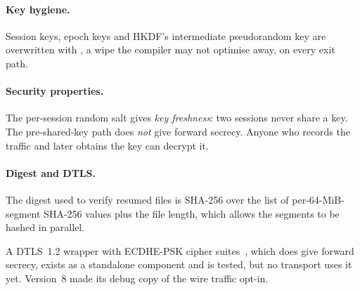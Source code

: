 \paragraph{Key hygiene.} Session keys, epoch keys and HKDF's intermediate pseudorandom key are overwritten
with , a wipe the compiler may not optimise away, on every exit path.

\paragraph{Security properties.} The per-session random salt gives \emph{key freshness}: two sessions never
share a key. The pre-shared-key path does \emph{not} give forward secrecy. Anyone who records the traffic and
later obtains the key can decrypt it.

\paragraph{Digest and DTLS.} The digest used to verify resumed files is SHA-256 over the list of
per-64-MiB-segment SHA-256 values plus the file length, which allows the segments to be hashed in parallel.

A DTLS~1.2 wrapper with ECDHE-PSK cipher suites~\cite{rfc6347,rfc4279}, which does give forward secrecy, exists
as a standalone component and is tested, but no transport uses it yet. Version~8 made its debug copy of the wire
traffic opt-in.
